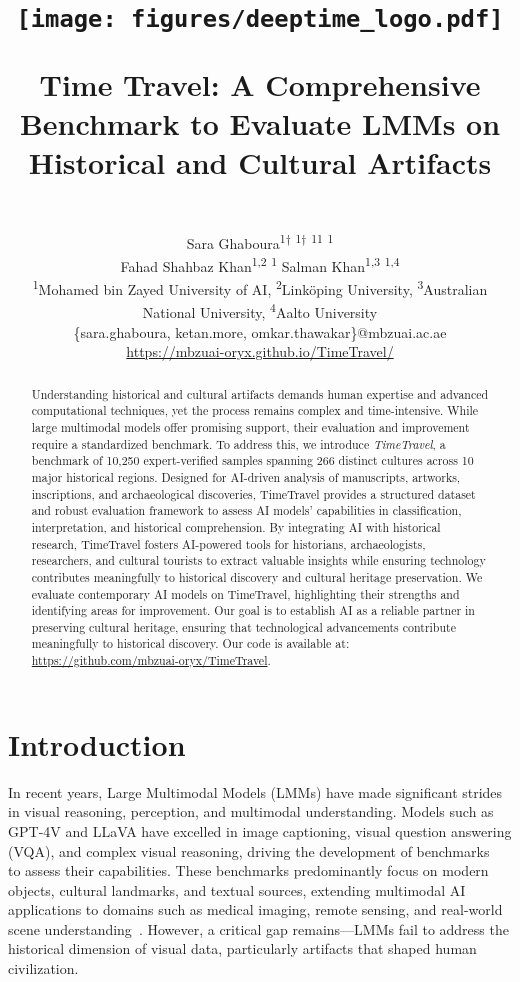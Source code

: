 \documentclass[11pt]{article}
\title{
    \begin{minipage}{0.12\textwidth} %
        \raggedleft
        \texttt{[image: figures/deeptime\_logo.pdf]} %
    \end{minipage}%
    \hspace{0.005cm} %
    \begin{minipage}{0.8\textwidth} %
        \centering
        \textbf{Time Travel: A Comprehensive Benchmark to Evaluate LMMs on Historical and Cultural Artifacts}
    \end{minipage}
}
\author{\\ {Sara Ghaboura}\textsuperscript{1$\dagger$} \quad{Ketan More}\textsuperscript{1$\dagger$} \quad{Ritesh Thawkar}\textsuperscript{1}\quad {Wafa Alghallabi }\textsuperscript{1} \quad{Omkar Thawakar}\textsuperscript{1} \\
  {Fahad Shahbaz Khan}\textsuperscript{1,2}  \quad    {Hisham Cholakkal}\textsuperscript{1} \quad  
     {Salman Khan}\textsuperscript{1,3} \quad  {Rao Muhammad Anwer}\textsuperscript{1,4}\\
     \fontsize{11pt}{12pt}\selectfont \textsuperscript{1}Mohamed bin Zayed University of AI, \textsuperscript{2}Linköping University, \textsuperscript{3}Australian National University,
     \textsuperscript{4}Aalto University \\
     \fontsize{10pt}{12pt}\selectfont \{{sara.ghaboura, ketan.more, omkar.thawakar}\}@mbzuai.ac.ae \\
 {\hypersetup{urlcolor=blue}
\fontsize{11pt}{12pt}\selectfont \href{https://mbzuai-oryx.github.io/TimeTravel/}{https://mbzuai-oryx.github.io/TimeTravel/}}}
\begin{document}
\maketitle
\begin{abstract}
Understanding historical and cultural artifacts demands human expertise and advanced computational techniques, yet the process remains complex and time-intensive. While large multimodal models offer promising support, their evaluation and improvement require a standardized benchmark. To address this, we introduce \emph{TimeTravel}, a benchmark of 10,250 expert-verified samples spanning 266 distinct cultures across 10 major historical regions. Designed for AI-driven analysis of manuscripts, artworks, inscriptions, and archaeological discoveries, TimeTravel provides a structured dataset and robust evaluation framework to assess AI models’ capabilities in classification, interpretation, and historical comprehension. By integrating AI with historical research, TimeTravel fosters AI-powered tools for historians, archaeologists, researchers, and cultural tourists to extract valuable insights while ensuring technology contributes meaningfully to historical discovery and cultural heritage preservation. We evaluate contemporary AI models on TimeTravel, highlighting their strengths and identifying areas for improvement. Our goal is to establish AI as a reliable partner in preserving cultural heritage, ensuring that technological advancements contribute meaningfully to historical discovery. Our code is available at: \href{https://github.com/mbzuai-oryx/TimeTravel}{https://github.com/mbzuai-oryx/TimeTravel}.
\def\thefootnote{$\dagger$}
\end{abstract}

\section{Introduction}
In recent years, Large Multimodal Models (LMMs) have made significant strides in visual reasoning, perception, and multimodal understanding. Models such as GPT-4V \cite{openai2024gpt4ocard} and LLaVA \cite{liu2023llava} have excelled in image captioning, visual question answering (VQA), and complex visual reasoning, driving the development of benchmarks~\cite{chiu2024culturalbench,nayak2024benchmarking,alwajih2024peacock} to assess their capabilities. These benchmarks predominantly focus on modern objects, cultural landmarks, and textual sources, extending multimodal AI applications to domains such as medical imaging, remote sensing, and real-world scene understanding~\cite{ghaboura2024camel}. However, a critical gap remains—LMMs fail to address the historical dimension of visual data, particularly artifacts that shaped human civilization.
\end{document}
